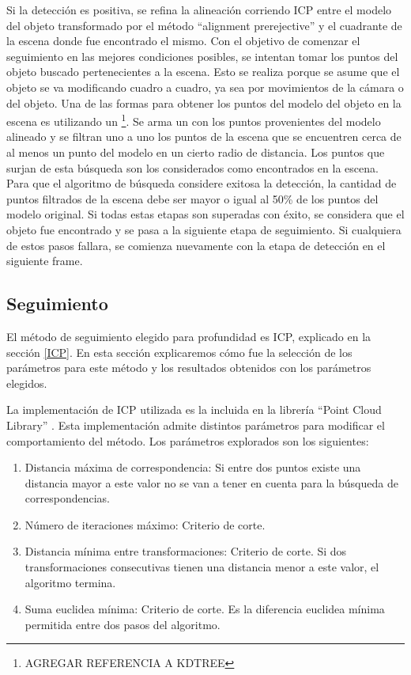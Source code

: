 Si la detección es positiva, se refina la alineación corriendo ICP entre el modelo del objeto transformado por el método ``alignment prerejective'' y el cuadrante de la escena donde fue encontrado el mismo. Con el objetivo de comenzar el seguimiento en las mejores condiciones posibles, se intentan tomar los puntos del objeto buscado pertenecientes a la escena. Esto se realiza porque se asume que el objeto se va modificando cuadro a cuadro, ya sea por movimientos de la cámara o del objeto. Una de las formas para obtener los puntos del modelo del objeto en la escena es utilizando un \kdt\footnote{AGREGAR REFERENCIA A KDTREE}.  Se arma un \kdt con los puntos provenientes del modelo alineado y se filtran uno a uno los puntos de la escena que se encuentren cerca de al menos un punto del modelo en un cierto radio de distancia.  Los puntos que surjan de esta búsqueda son los considerados como encontrados en la escena. Para que el algoritmo de búsqueda considere exitosa la detección, la cantidad de puntos filtrados de la escena debe ser mayor o igual al 50\% de los puntos del modelo original. Si todas estas etapas son superadas con éxito, se considera que el objeto fue encontrado y se pasa a la siguiente etapa de seguimiento. Si cualquiera de estos pasos fallara, se comienza nuevamente con la etapa de detección en el siguiente frame.


\subsection{Seguimiento}\label{tracking_d}
El método de seguimiento elegido para profundidad es ICP, explicado en la sección \ref{ICP}. En esta sección explicaremos cómo fue la selección de los parámetros para este método y los resultados obtenidos con los parámetros elegidos.

La implementación de ICP utilizada es la incluida en la librería ``Point Cloud Library'' \cite{Rusu_ICRA2011_PCL}. Esta implementación admite distintos parámetros para modificar el comportamiento del método. Los parámetros explorados son los siguientes:

\begin{enumerate}
	\item Distancia máxima de correspondencia: Si entre dos puntos existe una distancia mayor a este valor no se van a tener en cuenta para la búsqueda de correspondencias.
	\item Número de iteraciones máximo: Criterio de corte.
	\item Distancia mínima entre transformaciones: Criterio de corte. Si dos transformaciones consecutivas tienen una distancia menor a este valor, el algoritmo termina.
	\item Suma euclidea mínima: Criterio de corte. Es la diferencia euclidea mínima permitida entre dos pasos del algoritmo.
\end{enumerate}

